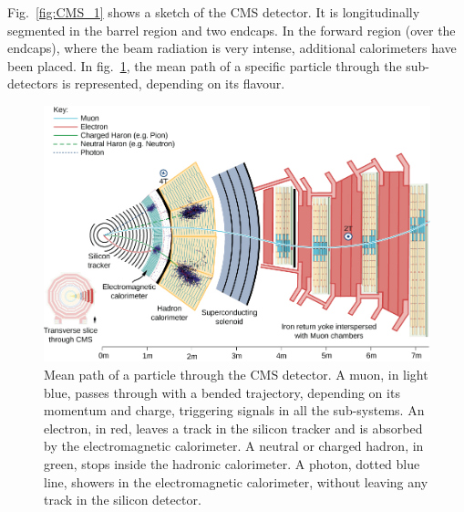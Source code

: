 \noindent Fig.~\ref{fig:CMS_1} shows a sketch of the CMS detector. It is longitudinally segmented in the barrel region and two endcaps. In the forward region (over the endcaps), where the beam radiation is very intense, additional calorimeters have been placed. In fig.~\ref{fig:CMS_particles}, the mean path of a specific particle through the sub-detectors is represented, depending on its flavour.

\begin{figure}[!htb]
  \centering
    \includegraphics[width=.99\textwidth]{figures/CMS_particles.jpg}
  \caption{Mean path of a particle through the CMS detector. A muon, in light blue, passes through with a bended trajectory, depending on its momentum and charge, triggering signals in all the sub-systems. An electron, in red, leaves a track in the silicon tracker and is absorbed by the electromagnetic calorimeter. A neutral or charged hadron, in green, stops inside the hadronic calorimeter. A photon, dotted blue line, showers in the electromagnetic calorimeter, without leaving any track in the silicon detector.}
  \label{fig:CMS_particles}
\end{figure}

